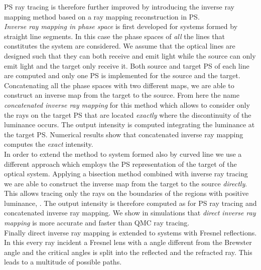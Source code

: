 PS ray tracing is therefore further improved by introducing the inverse ray mapping method based on a ray mapping reconstruction in PS. 
\\ \indent
\textit{Inverse ray mapping in phase space} is first developed for systems formed by straight line segments. In this case the phase spaces of \textit{all} the lines that constitutes the system are considered. We assume that the optical lines are designed such that they can both receive and emit light while the source can only emit light and the target only receive it. Both source and target PS of each line are computed and only one PS is implemented for the source and the target. Concatenating all the phase spaces with two different maps, we are able to construct an inverse map from the target to the source. From here the name \textit{concatenated inverse ray mapping} for this method which allows to consider only the rays on the target PS that are located \textit{exactly} where the discontinuity of the luminance occurs. The output intensity is computed integrating the luminance at the target PS. Numerical results show that concatenated inverse ray mapping computes the \textit{exact} intensity. \\ \indent In order to extend the method to system formed also by curved line we use a different approach which employs the PS representation of the target of the optical system. Applying a bisection method combined with inverse ray tracing we are able to construct the inverse map from the target to the source \textit{directly}. This allows tracing only the rays on the boundaries of the regions with positive luminance, \cite{filosa2017inverse}. The output intensity is therefore computed as for PS ray tracing and concatenated inverse ray mapping. We show in simulations that \textit{direct inverse ray mapping} is more accurate and faster than QMC ray tracing. \\ \indent Finally direct inverse ray mapping is extended to systems with Fresnel reflections. In this every ray incident a Fresnel lens with a angle different from the Brewster angle and the critical angles is split into the reflected and the refracted ray. This leads to a multitude of possible paths. 
